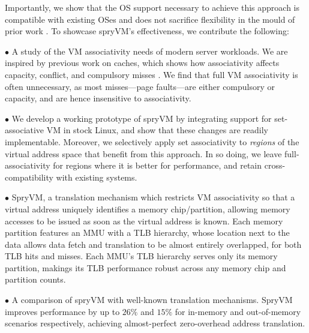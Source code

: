 Importantly, we show that the OS support necessary to
achieve this approach is compatible with existing OSes and does not
sacrifice flexibility in the mould of prior work \cite{basu:efficient,
  haria:devirtualizing}. To showcase spryVM's effectiveness, we
contribute the following:

\noindent $\bullet$ A study of the VM associativity needs of modern
server workloads. We are inspired by previous work on caches, which
shows how associativity affects capacity, conflict, and compulsory
misses \cite{hill:case}. We find that full VM associativity is often
unnecessary, as most misses---page faults---are either compulsory or
capacity, and are hence insensitive to associativity. 

\noindent $\bullet$ We develop a working prototype of spryVM by
integrating support for set-associative VM in stock Linux, and show
that these changes are readily implementable. Moreover, we selectively
apply set associativity to {\it regions} of the virtual address space
that benefit from this approach. In so doing, we leave
full-associativity for regions where it is better for performance, and
retain cross-compatibility with existing systems.

\noindent $\bullet$ SpryVM, a translation mechanism which restricts VM
associativity so that a virtual address uniquely identifies a memory
chip/partition, allowing memory accesses to be issued as soon as the
virtual address is known. Each memory partition features an MMU with a
TLB hierarchy, whose location next to the data allows data fetch and translation 
to be almost entirely overlapped, for both TLB hits and misses. Each MMU's
TLB hierarchy serves only its memory partition, makings its TLB
performance  robust across any memory chip and partition counts.

\noindent $\bullet$ A comparison of spryVM with well-known translation
mechanisms. SpryVM improves performance by up to $26\%$ and $15\%$ for
in-memory and out-of-memory scenarios respectively, achieving
almost-perfect zero-overhead address translation.
